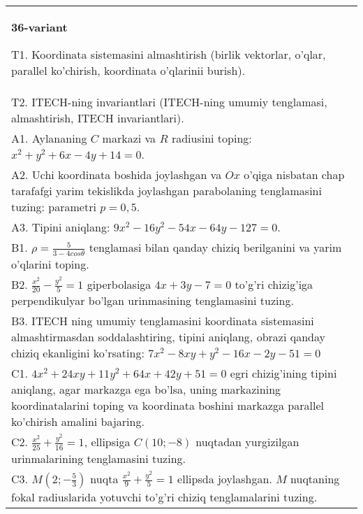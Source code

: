 \documentclass{article}
\begin{document}
\begin{tabular}{m{17cm}}
\textbf{36-variant}
\newline

T1. Koordinata sistemasini almashtirish (birlik vektorlar, o'qlar, parallel ko'chirish, koordinata o'qlarinii burish).\\

T2. ITECH-ning invariantlari (ITECH-ning umumiy tenglamasi, almashtirish, ITECH invariantlari).\\

A1. Aylananing $C$ markazi va $R$ radiusini toping: $x^2+y^2+6x-4y+14=0$.\\

A2. Uchi koordinata boshida joylashgan va $Ox$ o'qiga nisbatan chap tarafafgi yarim tekislikda joylashgan parabolaning tenglamasini tuzing: parametri $p=0,5$.\\

A3. Tipini aniqlang: $9x^{2}-16y^{2}-54x-64y-127=0$.\\

B1. $\rho = \frac{5}{3 - 4cos\theta}$ tenglamasi bilan qanday chiziq berilganini va yarim o'qlarini toping.  \\

B2. $\frac{x^{2}}{20} - \frac{y^{2}}{5} = 1$ giperbolasiga $4x + 3y - 7 = 0$ to'g'ri chizig'iga perpendikulyar bo'lgan urinmasining tenglamasini tuzing.  \\

B3. ITECH ning umumiy tenglamasini koordinata sistemasini almashtirmasdan soddalashtiring, tipini aniqlang, obrazi qanday chiziq ekanligini ko'rsating: $7x^{2} - 8xy + y^{2} - 16x - 2y - 51 = 0$\\

C1. $4x^{2} + 24xy + 11y^{2} + 64x + 42y + 51 = 0$ egri chizig'ining tipini aniqlang, agar markazga ega bo'lsa, uning markazining koordinatalarini toping va koordinata boshini markazga parallel ko'chirish amalini bajaring.\\

C2. $\frac{x^{2}}{25} + \frac{y^{2}}{16} = 1$, ellipsiga $C(10; - 8)$ nuqtadan yurgizilgan urinmalarining tenglamasini tuzing.  \\

C3. $M(2; - \frac{5}{3})$ nuqta $\frac{x^{2}}{9} + \frac{y^{2}}{5} = 1$ ellipsda joylashgan. $M$ nuqtaning fokal radiuslarida yotuvchi to'g'ri chiziq tenglamalarini tuzing.  \\

\end{tabular}
\vspace{1cm}
\end{document}
